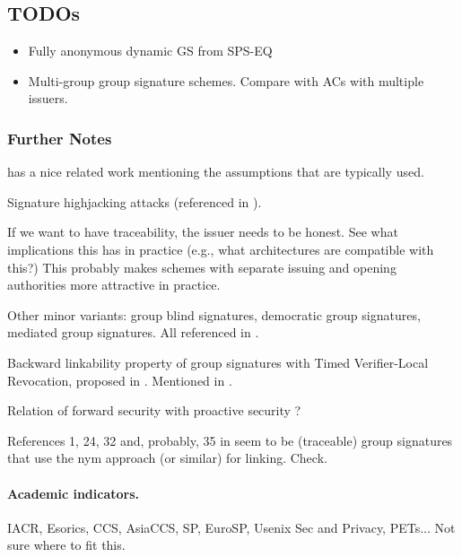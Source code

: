\subsection{TODOs}

\begin{itemize}
\item Fully anonymous dynamic GS from SPS-EQ \cite{ds16}
\item Multi-group group signature schemes. Compare with ACs with multiple
  issuers.
\end{itemize}

\subsubsection{Further Notes}


\cite{ehk+19} has a nice related work mentioning the assumptions that are
typically used.

Signature highjacking attacks (referenced in \cite{ehk+19}).

If we want to have traceability, the issuer needs to be honest. See what
implications this has in practice (e.g., what architectures are compatible
with this?) This probably makes schemes with separate issuing and opening
authorities more attractive in practice.

Other minor variants: group blind signatures, democratic group signatures,
mediated group signatures. All referenced in \cite[Section 1.3.5]{bsi12}.

Backward linkability property of group signatures with Timed Verifier-Local
Revocation, proposed in \cite{nf05}. Mentioned in \cite[Section 8.1.2]{bsi12}.

Relation of forward security with proactive security \cite{oy91}?

References 1, 24, 32 and, probably, 35 in \cite{bfg+11} seem to be (traceable)
group signatures that use the nym approach (or similar) for linking. Check.

\paragraph{Academic indicators.}
IACR, Esorics, CCS, AsiaCCS, SP, EuroSP, Usenix Sec and Privacy, PETs... Not
sure where to fit this.

